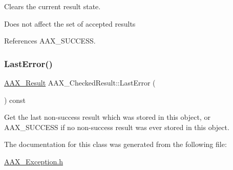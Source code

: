 Clears the current result state. 

Does not affect the set of accepted results 

References A\+A\+X\+\_\+\+S\+U\+C\+C\+E\+SS.

\mbox{\label{a01601_af0e297a396bf7ea3dfcdc7f71d85486f}} 
\subsubsection{\texorpdfstring{LastError()}{LastError()}}
{\footnotesize\ttfamily \mbox{\hyperlink{a00392_a4d8f69a697df7f70c3a8e9b8ee130d2f}{A\+A\+X\+\_\+\+Result}} A\+A\+X\+\_\+\+Checked\+Result\+::\+Last\+Error (\begin{DoxyParamCaption}{ }\end{DoxyParamCaption}) const\hspace{0.3cm}{\ttfamily [inline]}}



Get the last non-\/success result which was stored in this object, or A\+A\+X\+\_\+\+S\+U\+C\+C\+E\+SS if no non-\/success result was ever stored in this object. 



The documentation for this class was generated from the following file\+:\begin{DoxyCompactItemize}
\item 
\mbox{\hyperlink{a00497}{A\+A\+X\+\_\+\+Exception.\+h}}\end{DoxyCompactItemize}
